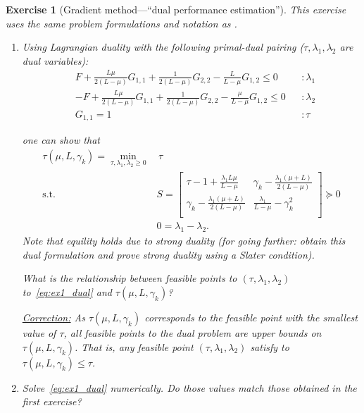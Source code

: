\documentclass[11pt,a4paper]{article}
\newcommand{\correction}[1]{{{\color{blue}\underline{Correction:} #1}}}
\newcommand{\correction}[1]{}
\newtheorem{exercise}{Exercise}
\begin{document}
	\begin{exercise}[Gradient method---``dual performance estimation''] This exercise uses the same problem formulations and notation as .
	\begin{enumerate}
		\item Using Lagrangian duality with the following primal-dual pairing ($\tau,\lambda_1,\lambda_2$ are dual variables):
	\begin{equation*}
			\begin{aligned}
			& F + \tfrac{L\mu}{2(L-\mu)} G_{1,1}+\tfrac{1}{2(L-\mu)}G_{2,2}-\tfrac{L}{L-\mu}G_{1,2}\leqslant 0&&:\lambda_1\\
			&-F + \tfrac{L\mu}{2(L-\mu)} G_{1,1}+\tfrac{1}{2(L-\mu)}G_{2,2}-\tfrac{\mu}{L-\mu}G_{1,2}\leqslant 0&&:\lambda_2\\
			&G_{1,1}= 1&&:\tau
			\end{aligned}
			\end{equation*}
	
	 one can show that
		\begin{equation}\label{eq:ex1_dual}	 
		\begin{aligned}
			\tau(\mu,L,\gamma_k)=\min_{\tau,\lambda_1,\lambda_2\geqslant 0} & \,\tau\\
			\text{s.t. }& S=\begin{bmatrix}
				\tau-1+\frac{\lambda_1 L\mu}{L-\mu } & \gamma_k-\frac{\lambda_1 (\mu +L)}{2 (L-\mu )} \\
				\gamma_k-\frac{\lambda_1 (\mu +L)}{2 (L-\mu )} & \frac{\lambda_1}{L-\mu }-\gamma_k^2 \\
			\end{bmatrix}\succcurlyeq 0\\
			&0=\lambda_1-\lambda_2.
		\end{aligned}
		\end{equation}
	Note that equility holds due to strong duality (for going further: obtain this dual formulation and prove strong duality using a Slater condition). 
	
	What is the relationship between feasible points to $(\tau,\lambda_1,\lambda_2)$ to~\eqref{eq:ex1_dual} and $\tau(\mu,L,\gamma_k)$?
	
	\correction{As $\tau(\mu,L,\gamma_k)$ corresponds to the feasible point with the smallest value of $\tau$, all feasible points to the dual problem are upper bounds on $\tau(\mu,L,\gamma_k)$. That is, any feasible point $(\tau,\lambda_1,\lambda_2)$ satisfy to $\tau(\mu,L,\gamma_k)\leqslant \tau$.}
	
	\item Solve~\eqref{eq:ex1_dual} numerically. Do those values match those obtained in the first exercise? 
	

\end{enumerate}
\end{exercise}
\end{document}
